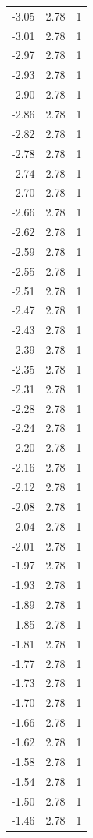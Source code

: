 \begin{longtable}{lrr}
  -3.05 & 2.78 & 1 \\
  -3.01 & 2.78 & 1 \\
  -2.97 & 2.78 & 1 \\
  -2.93 & 2.78 & 1 \\
  -2.90 & 2.78 & 1 \\
  -2.86 & 2.78 & 1 \\
  -2.82 & 2.78 & 1 \\
  -2.78 & 2.78 & 1 \\
  -2.74 & 2.78 & 1 \\
  -2.70 & 2.78 & 1 \\
  -2.66 & 2.78 & 1 \\
  -2.62 & 2.78 & 1 \\
  -2.59 & 2.78 & 1 \\
  -2.55 & 2.78 & 1 \\
  -2.51 & 2.78 & 1 \\
  -2.47 & 2.78 & 1 \\
  -2.43 & 2.78 & 1 \\
  -2.39 & 2.78 & 1 \\
  -2.35 & 2.78 & 1 \\
  -2.31 & 2.78 & 1 \\
  -2.28 & 2.78 & 1 \\
  -2.24 & 2.78 & 1 \\
  -2.20 & 2.78 & 1 \\
  -2.16 & 2.78 & 1 \\
  -2.12 & 2.78 & 1 \\
  -2.08 & 2.78 & 1 \\
  -2.04 & 2.78 & 1 \\
  -2.01 & 2.78 & 1 \\
  -1.97 & 2.78 & 1 \\
  -1.93 & 2.78 & 1 \\
  -1.89 & 2.78 & 1 \\
  -1.85 & 2.78 & 1 \\
  -1.81 & 2.78 & 1 \\
  -1.77 & 2.78 & 1 \\
  -1.73 & 2.78 & 1 \\
  -1.70 & 2.78 & 1 \\
  -1.66 & 2.78 & 1 \\
  -1.62 & 2.78 & 1 \\
  -1.58 & 2.78 & 1 \\
  -1.54 & 2.78 & 1 \\
  -1.50 & 2.78 & 1 \\
  -1.46 & 2.78 & 1 \\

\end{longtable}
